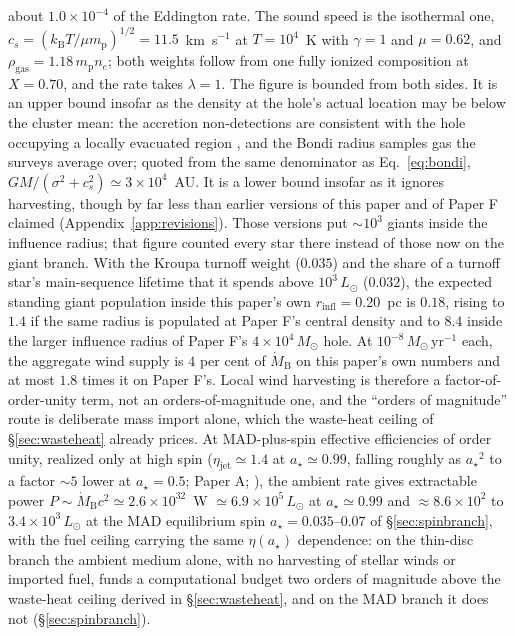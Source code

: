 \documentclass[11pt]{article}
\newcommand{\msun}{\ensuremath{M_\odot}}
\newcommand{\astar}{\ensuremath{a_\star}}
\begin{document}
about $1.0\times10^{-4}$ of the Eddington rate. The sound speed is the isothermal one, $c_{s} = (k_{\mathrm{B}}T/\mu m_{\mathrm{p}})^{1/2} = 11.5$~km~s$^{-1}$ at $T = 10^{4}$~K with $\gamma = 1$ and $\mu = 0.62$, and $\rho_{\mathrm{gas}} = 1.18\,m_{\mathrm{p}}n_{e}$; both weights follow from one fully ionized composition at $X = 0.70$, and the rate takes $\lambda = 1$. The figure is bounded from both sides. It is an upper bound insofar as the density at the hole's actual location may be below the cluster mean: the accretion non-detections are consistent with the hole occupying a locally evacuated region \citep{Mahida2026}, and the Bondi radius samples gas the surveys average over; quoted from the same denominator as Eq.~\ref{eq:bondi}, $GM/(\sigma^{2}+c_{s}^{2}) \simeq 3\times10^{4}$~AU. It is a lower bound insofar as it ignores harvesting, though by far less than earlier versions of this paper and of Paper F claimed (Appendix~\ref{app:revisions}). Those versions put $\sim 10^{3}$ giants inside the influence radius; that figure counted every star there instead of those now on the giant branch. With the Kroupa turnoff weight ($0.035$) and the share of a turnoff star's main-sequence lifetime that it spends above $10^{3}\,L_{\odot}$ ($0.032$), the expected standing giant population inside this paper's own $r_{\mathrm{infl}} = 0.20$~pc is $0.18$, rising to $1.4$ if the same radius is populated at Paper F's central density and to $8.4$ inside the larger influence radius of Paper F's $4\times10^{4}\,\msun$ hole. At $10^{-8}\,\msun\,\mathrm{yr^{-1}}$ each, the aggregate wind supply is $4$ per cent of $\dot{M}_{\mathrm{B}}$ on this paper's own numbers and at most $1.8$ times it on Paper F's. Local wind harvesting is therefore a factor-of-order-unity term, not an orders-of-magnitude one, and the ``orders of magnitude'' route is deliberate mass import alone, which the waste-heat ceiling of \S\ref{sec:wasteheat} already prices. At MAD-plus-spin effective efficiencies of order unity, realized only at high spin ($\eta_{\mathrm{jet}} \simeq 1.4$ at $\astar \simeq 0.99$, falling roughly as $\astar^{2}$ to a factor $\sim 5$ lower at $\astar = 0.5$; Paper A; \citealt{Tchekhovskoy2011}), the ambient rate gives extractable power $P \sim \dot{M}_{\mathrm{B}}c^{2} \simeq 2.6\times10^{32}$~W $\simeq 6.9\times10^{5}\,L_{\odot}$ at $\astar \simeq 0.99$ and $\approx 8.6\times10^{2}$ to $3.4\times10^{3}\,L_{\odot}$ at the MAD equilibrium spin $\astar = 0.035$--$0.07$ of \S\ref{sec:spinbranch}, with the fuel ceiling carrying the same $\eta(\astar)$ dependence: on the thin-disc branch the ambient medium alone, with no harvesting of stellar winds or imported fuel, funds a computational budget two orders of magnitude above the waste-heat ceiling derived in \S\ref{sec:wasteheat}, and on the MAD branch it does not (\S\ref{sec:spinbranch}).
\end{document}
